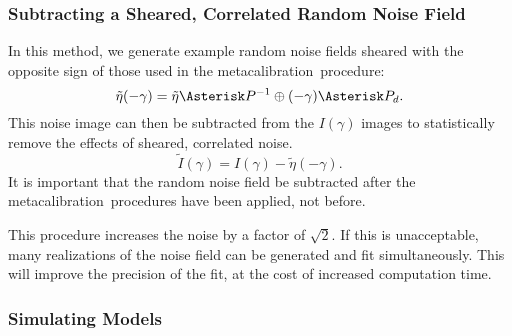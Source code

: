 \documentclass[usegraphicx,usenatbib]{mn2e}
\newcommand{\mcal}{metacalibration}
\begin{document}
\subsubsection{Subtracting a Sheared, Correlated Random Noise Field}

In this method, we generate example random noise fields sheared with the
opposite sign of those used in the \mcal\ procedure:
\begin{equation}
    \tilde{\eta}(-\gamma) = \tilde{\eta} \Asterisk P^{-1} \oplus (-\gamma) \Asterisk P_{d}.
\end{equation}
This noise image can then be subtracted from the $I(\gamma)$ images to
statistically remove the effects of sheared, correlated noise.
\begin{equation}
    \tilde{I}(\gamma) = I(\gamma) - \tilde{\eta}(-\gamma).
\end{equation}
It is important that the random noise field be subtracted after the \mcal\
procedures have been applied, not before.

This procedure increases the noise by a factor of $\sqrt 2$.  If this
is unacceptable, many realizations of the noise field can be generated
and fit simultaneously.  This will improve the precision of the fit,
at the cost of increased computation time.


\subsubsection{Simulating Models}
\end{document}
